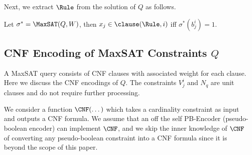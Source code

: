 	Next, we extract $\Rule$ from the solution of $Q$ as follows. 
	\begin{construction}
		Let $\sigma^* = \MaxSAT(Q,W)$, then $x_j \in {\clause(\Rule,i)}$ iff $\sigma^*(b_{j}^i) = 1$.
	\end{construction}
	
	
	\subsection{CNF Encoding of MaxSAT Constraints $ Q $}
	A MaxSAT query consists of CNF clauses with associated weight for each clause. Here we discuss the CNF encodings of $ Q $. The constraints $ V^i_j $ and $ N_q $ are unit clauses and do not require further processing.
	
	We consider a function $ \CNF(\dots) $ which takes a cardinality constraint as input and outputs a CNF formula. We assume that an off the self PB-Encoder (pseudo-boolean encoder) can implement  $ \CNF $, and we skip the inner knowledge of  $ \CNF $ of converting any pseudo-boolean constraint into a CNF formula since it is beyond the scope of this paper. 
	
